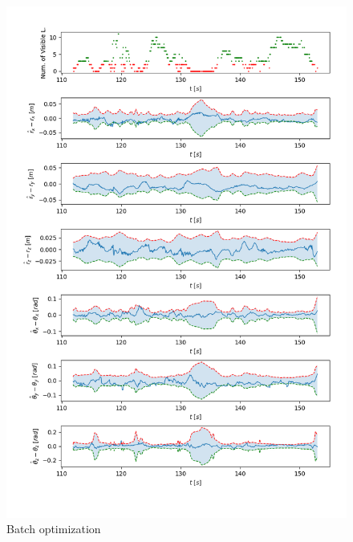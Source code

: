 \documentclass[a4paper]{article}
\begin{document}
\begin{figure}[H]
    \centering
    \includegraphics[width=\textwidth]{code/batch.png}
    \caption{Batch optimization}
    \label{fig:5a}
\end{figure}
\end{document}
